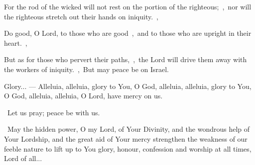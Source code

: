 \documentclass[12pt,twoside,a5paper]{article}
\begin{document}
\begin{halfparskip}
  For the rod of the wicked will not rest on the portion of the righteous;~\sep\ nor will the righteous stretch out their hands on iniquity.~\sep

  Do good, O Lord, to those who are good~\sep\ and to those who are upright in their heart.~\sep

  But as for those who pervert their paths,~\sep\ the Lord will drive them away with the workers of iniquity.~\sep\ But may peace be on Israel.

  Glory... --- Alleluia, alleluia, glory to You, O God, alleluia, alleluia, glory to You, O God, alleluia, alleluia, O Lord, have mercy on us.
\end{halfparskip}

\dd~Let us pray; peace be with us.

\cc~May the hidden power, O my Lord, of Your Divinity, and the wondrous help of Your Lordship, and the great aid of Your mercy strengthen the weakness of our feeble nature to lift up to You glory, honour, confession and worship at all times, Lord of all...


\end{document}
